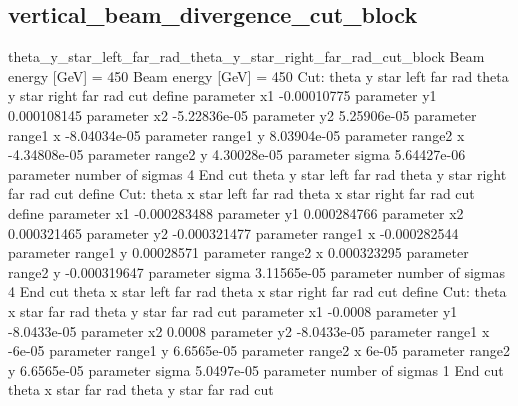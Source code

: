 \documentclass{article}
\begin{document}
\begin{landscape}
\subsection{vertical\_beam\_divergence\_cut\_block}
theta\_y\_star\_left\_far\_rad\_theta\_y\_star\_right\_far\_rad\_cut\_block \newline
Beam energy [GeV] = 450 \newline
Beam energy [GeV] = 450 \newline
\newpage
Cut: theta y star left far rad theta y star right far rad cut define 
parameter 	x1 -0.00010775
parameter 	y1 0.000108145
parameter 	x2 -5.22836e-05
parameter 	y2 5.25906e-05
parameter range1 x -8.04034e-05
parameter range1 y 8.03904e-05
parameter range2 x -4.34808e-05
parameter range2 y 4.30028e-05
parameter sigma 5.64427e-06
parameter number of sigmas 4
End cut theta y star left far rad theta y star right far rad cut define\newline 
Cut: theta x star left far rad theta x star right far rad cut define 
parameter 	x1 -0.000283488
parameter 	y1 0.000284766
parameter 	x2 0.000321465
parameter 	y2 -0.000321477
parameter range1 x -0.000282544
parameter range1 y 0.00028571
parameter range2 x 0.000323295
parameter range2 y -0.000319647
parameter sigma 3.11565e-05
parameter number of sigmas 4
End cut theta x star left far rad theta x star right far rad cut define\newline 
Cut: theta x star far rad theta y star far rad cut 
parameter 	x1 -0.0008
parameter 	y1 -8.0433e-05
parameter 	x2 0.0008
parameter 	y2 -8.0433e-05
parameter range1 x -6e-05
parameter range1 y 6.6565e-05
parameter range2 x 6e-05
parameter range2 y 6.6565e-05
parameter sigma 5.0497e-05
parameter number of sigmas 1
End cut theta x star far rad theta y star far rad cut\newline 
\begin{figure}[H]
	\flushleft
\end{figure}
\begin{figure}[H]
	\flushleft
\end{figure}
\begin{figure}[H]
	\flushleft
\end{figure}
\begin{figure}[H]
	\flushleft
\end{figure}
\begin{figure}[H]
	\flushleft
\end{figure}
\begin{figure}[H]
	\flushleft
\end{figure}

\end{landscape}
\end{document}
